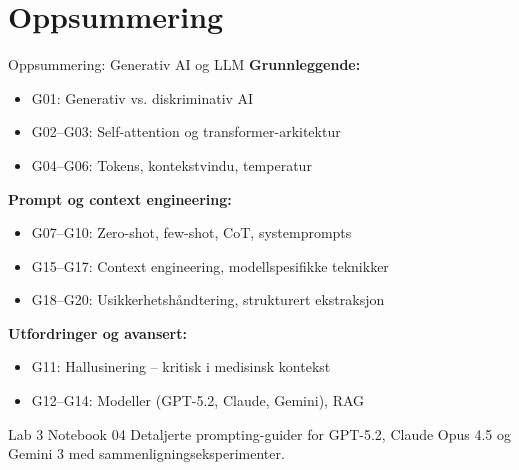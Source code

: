 \documentclass[aspectratio=169, 10pt]{beamer}
\begin{document}
\section*{Oppsummering}

\begin{frame}{Oppsummering: Generativ AI og LLM}
    \textbf{Grunnleggende:}
    \begin{itemize}
        \item G01: Generativ vs. diskriminativ AI
        \item G02--G03: Self-attention og transformer-arkitektur
        \item G04--G06: Tokens, kontekstvindu, temperatur
    \end{itemize}

    \textbf{Prompt og context engineering:}
    \begin{itemize}
        \item G07--G10: Zero-shot, few-shot, CoT, systemprompts
        \item G15--G17: Context engineering, modellspesifikke teknikker
        \item G18--G20: Usikkerhetshåndtering, strukturert ekstraksjon
    \end{itemize}

    \textbf{Utfordringer og avansert:}
    \begin{itemize}
        \item G11: Hallusinering -- kritisk i medisinsk kontekst
        \item G12--G14: Modeller (GPT-5.2, Claude, Gemini), RAG
    \end{itemize}

    \vspace{0.1cm}
    \begin{block}{\footnotesize Lab 3 Notebook 04}
        \footnotesize Detaljerte prompting-guider for GPT-5.2, Claude Opus 4.5 og Gemini 3 med sammenligningseksperimenter.
    \end{block}
\end{frame}
\end{document}
